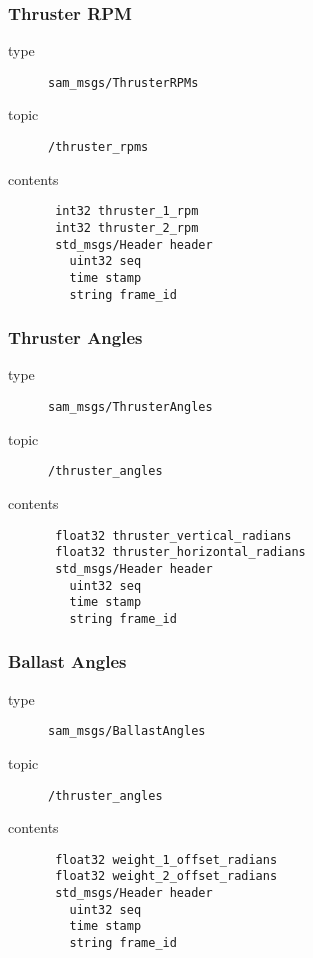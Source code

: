 \documentclass[9pt,technote]{IEEEtran} %
\begin{document}
\subsubsection{Thruster RPM}

\begin{description}
\item[type] \texttt{sam\_msgs/ThrusterRPMs}
\item[topic] \texttt{/thruster\_rpms}
\item[contents] \begin{scriptsize}
\begin{verbatim}
 int32 thruster_1_rpm
 int32 thruster_2_rpm
 std_msgs/Header header
   uint32 seq
   time stamp
   string frame_id
\end{verbatim}
\end{scriptsize}
\end{description}

\subsubsection{Thruster Angles}

\begin{description}
\item[type] \texttt{sam\_msgs/ThrusterAngles}
\item[topic] \texttt{/thruster\_angles}
\item[contents] \begin{scriptsize}
\begin{verbatim}
 float32 thruster_vertical_radians
 float32 thruster_horizontal_radians
 std_msgs/Header header
   uint32 seq
   time stamp
   string frame_id
\end{verbatim}
\end{scriptsize}
\end{description}

\subsubsection{Ballast Angles}

\begin{description}
\item[type] \texttt{sam\_msgs/BallastAngles}
\item[topic] \texttt{/thruster\_angles}
\item[contents] \begin{scriptsize}
\begin{verbatim}
 float32 weight_1_offset_radians
 float32 weight_2_offset_radians
 std_msgs/Header header
   uint32 seq
   time stamp
   string frame_id
\end{verbatim}
\end{scriptsize}
\end{description}
\end{document}
